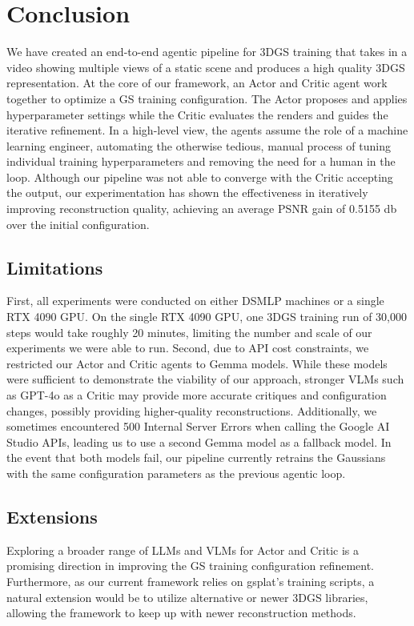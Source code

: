 \section{Conclusion}
\label{sec:expected_outcomes}

\noindent We have created an end-to-end agentic pipeline for 3DGS training that takes in a video showing multiple views of a static scene and produces a high quality 3DGS representation. At the core of our framework, an Actor and Critic agent work together to optimize a GS training configuration. The Actor proposes and applies hyperparameter settings while the Critic evaluates the renders and guides the iterative refinement. In a high-level view, the agents assume the role of a machine learning engineer, automating the otherwise tedious, manual process of tuning individual training hyperparameters and removing the need for a human in the loop. Although our pipeline was not able to converge with the Critic accepting the output, our experimentation has shown the effectiveness in iteratively improving reconstruction quality, achieving an average PSNR gain of 0.5155 db over the initial configuration.\\

\subsection{Limitations}
\noindent First, all experiments were conducted on either DSMLP machines or a single RTX 4090 GPU. On the single RTX 4090 GPU, one 3DGS training run of 30,000 steps would take roughly 20 minutes, limiting the number and scale of our experiments we were able to run. Second, due to API cost constraints, we restricted our Actor and Critic agents to Gemma models. While these models were sufficient to demonstrate the viability of our approach, stronger VLMs such as GPT-4o as a Critic may provide more accurate critiques and configuration changes, possibly providing higher-quality reconstructions. Additionally, we sometimes encountered 500 Internal Server Errors when calling the Google AI Studio APIs, leading us to use a second Gemma model as a fallback model. In the event that both models fail, our pipeline currently retrains the Gaussians with the same configuration parameters as the previous agentic loop.\\

\subsection{Extensions}
\noindent Exploring a broader range of LLMs and VLMs for Actor and Critic is a promising direction in improving the GS training configuration refinement. Furthermore, as our current framework relies on gsplat’s training scripts, a natural extension would be to utilize alternative or newer 3DGS libraries, allowing the framework to keep up with newer reconstruction methods.\\

